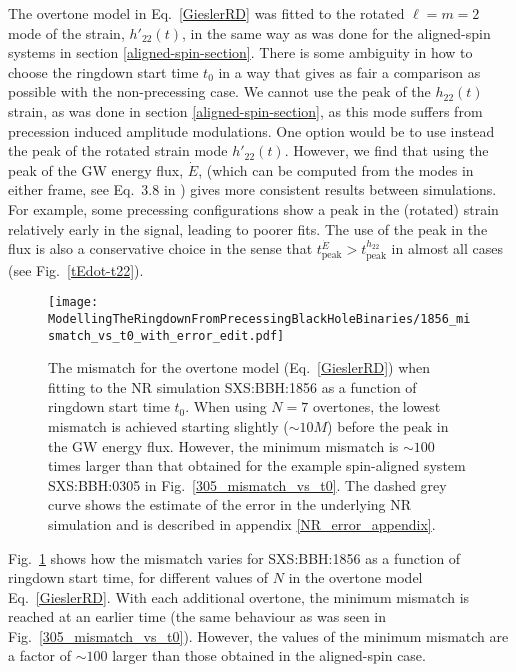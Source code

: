 The overtone model in Eq.~\ref{GieslerRD} was fitted to the rotated $\ell=m=2$ mode of the strain, $h'_{22}(t)$, in the same way as was done for the aligned-spin systems in section \ref{aligned-spin-section}.
There is some ambiguity in how to choose the ringdown start time $t_0$ in a way that gives as fair a comparison as possible with the non-precessing case.
We cannot use the peak of the $h_{22}(t)$ strain, as was done in section \ref{aligned-spin-section}, as this mode suffers from precession induced amplitude modulations. 
One option would be to use instead the peak of the rotated strain mode $h'_{22}(t)$.
However, we find that using the peak of the GW energy flux, $\dot{E}$, (which can be computed from the modes in either frame, see Eq.~3.8 in \cite{Ruiz:2007yx}) gives more consistent results between simulations. For example, some precessing configurations show a peak in the (rotated) strain relatively early in the signal, leading to poorer fits.
The use of the peak in the flux is also a conservative choice in the sense that $t_{\mathrm{peak}}^{\dot{E}} > t_{\mathrm{peak}}^{h_{22}}$ in almost all cases (see Fig.~\ref{tEdot-t22}).

\begin{figure}[t]
    \centering
    \texttt{[image: ModellingTheRingdownFromPrecessingBlackHoleBinaries/1856\_mismatch\_vs\_t0\_with\_error\_edit.pdf]}
    \caption[Mismatch as a function of ringdown start time for an overtone model fitted to SXS:BBH:1856]{
    The mismatch for the overtone model (Eq.~\ref{GieslerRD}) when fitting to the NR simulation SXS:BBH:1856 as a function of ringdown start time $t_0$. When using $N=7$ overtones, the lowest mismatch is achieved starting slightly ($\sim 10M$) before the peak in the GW energy flux.
    However, the minimum mismatch is $\sim 100$ times larger than that obtained for the example spin-aligned system SXS:BBH:0305 in Fig.~\ref{305_mismatch_vs_t0}. The dashed grey curve shows the estimate of the error in the underlying NR simulation and is described in appendix \ref{NR_error_appendix}.
    }
    \label{1856_mismatch_vs_t0}
\end{figure}

Fig.~\ref{1856_mismatch_vs_t0} shows how the mismatch varies for SXS:BBH:1856 as a function of ringdown start time, for different values of $N$ in the overtone model Eq.~\ref{GieslerRD}.
With each additional overtone, the minimum mismatch is reached at an earlier time (the same behaviour as was seen in Fig.~\ref{305_mismatch_vs_t0}).
However, the values of the minimum mismatch are a factor of $\sim 100$ larger than those obtained in the aligned-spin case. 

